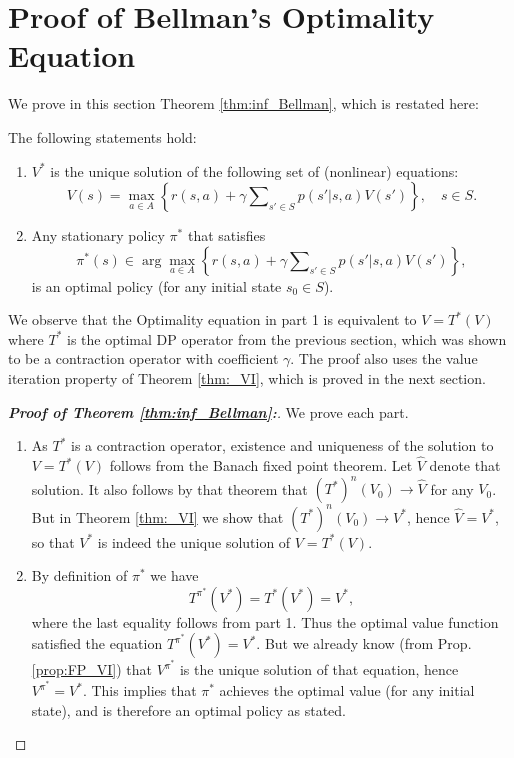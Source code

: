 \section{Proof of Bellman's Optimality Equation}
We prove in this section Theorem \ref{thm:inf_Bellman}, which is restated here:
\begin{theorem*}
The following statements hold:
\begin{enumerate}
  \item $V_{}^*$ is the unique solution of the following set of (nonlinear) equations:
\begin{equation}\label{eq:Bellman2}
V(s) = \mathop {\max }\limits_{a \in A} \left\{ {r(s,a) + \gamma \sum\nolimits_{s' \in S} {p(s'|s,a)V(s')} } \right\},     \quad s \in S.
\end{equation}
  \item Any stationary policy ${\pi ^*}$ that satisfies
\[{\pi ^*}(s) \in \arg {\max _{a \in A}}\left\{ {r(s,a) + \gamma \sum\nolimits_{s' \in S} {p(s'|s,a)V(s')} } \right\},\]
     is an optimal policy (for any initial state ${s_0} \in S$).
\end{enumerate}
\end{theorem*}
We observe that the Optimality equation in part 1 is equivalent to
$V = {T^*}(V)$
where ${T^*}$ is the optimal DP operator from the previous section, which was shown to be a contraction operator with coefficient $\gamma $.  The proof also uses the value iteration property of Theorem \ref{thm:_VI}, which is proved in the next section.

\begin{proof}[\textbf{Proof of Theorem \ref{thm:inf_Bellman}:}]
We prove each part.
\begin{enumerate}
  \item As $T_{}^*$ is a contraction operator, existence and uniqueness of the solution to $V = T_{}^*(V)$ follows from the Banach fixed point theorem. Let $\hat V$ denote that solution. It also follows by that theorem that ${(T_{}^*)^n}({V_0}) \to \hat V$ for any ${V_0}$. But in Theorem \ref{thm:_VI} we show that ${(T_{}^*)^n}({V_0}) \to V_{}^*$, hence $\hat V = V_{}^*$,  so that $V_{}^*$ is indeed the unique solution of  $V = T_{}^*(V)$.
  \item By definition of  ${\pi ^*}$ we have
\[T_{}^{\pi ^*}(V_{}^*) = T_{}^*(V_{}^*) = V_{}^*,\]
where the last equality follows from part 1. Thus the optimal value function satisfied the equation $T_{}^{\pi ^*}(V_{}^*) = V_{}^*$. But we already know (from Prop. \ref{prop:FP_VI}) that $V_{}^{\pi ^*}$ is the unique solution of that equation, hence $V_{}^{\pi ^*} = V_{}^*$. This implies that ${\pi ^*}$ achieves the optimal value (for any initial state), and is therefore an optimal policy as stated.
\end{enumerate}
\end{proof}

